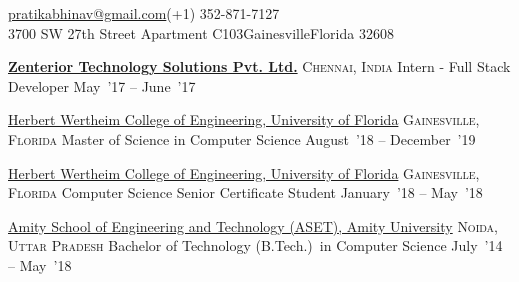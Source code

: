 \documentclass[10pt,a4paper]{article}
\begin{document}
\sloppy  %



\nobreakvspace{0.3em}  %

\noindent\href{mailto:pratikabhinav@gmail.com}{pratikabhinav\mbox{}@\mbox{}gmail.com}\sbull (+1) 352-871-7127\\
3700 SW 27th Street\sbull
Apartment C103\sbull Gainesville\sbull Florida 32608
\spacedhrule{0.5em}{-0.4em}


\headedsection  %
  {\href{}{\textbf{Zenterior Technology Solutions Pvt. Ltd.}}}
  {\textsc{Chennai, India}}
  {%
  \headedsubsection
    {Intern - Full Stack Developer}
    {May~'17 -- June~'17}
    {}
}


\headedsection
  {\href{}{Herbert Wertheim College of Engineering, University of Florida}}
  {\textsc{Gainesville, Florida}} {%
  \headedsubsection
    {Master of Science in Computer Science }
    {August~'18 -- December~'19} {}
}

\headedsection
  {\href{}{Herbert Wertheim College of Engineering, University of Florida}}
  {\textsc{Gainesville, Florida}} {%
  \headedsubsection
    {Computer Science Senior Certificate Student}
    {January~'18 -- May~'18} {}
}

\headedsection
  {\href{}{Amity School of Engineering and Technology (ASET), Amity University}}
  {\textsc{Noida, Uttar Pradesh}} {%
  \headedsubsection
    {Bachelor of Technology (B.Tech.)~in Computer Science}
    {July~'14 -- May~'18} {}
}
\end{document}
